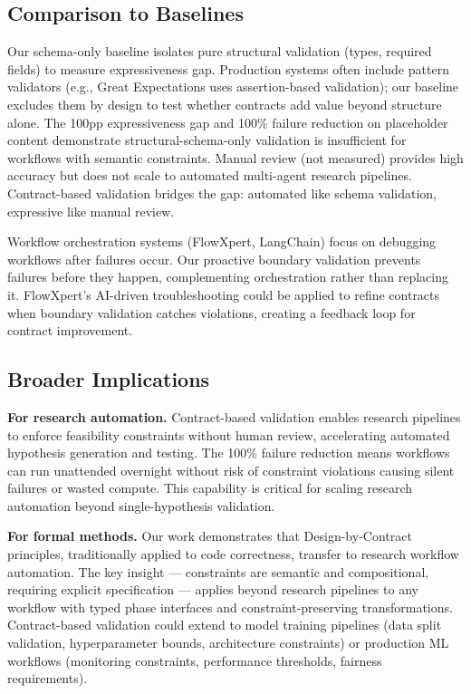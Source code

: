 \subsection{Comparison to Baselines}

Our schema-only baseline isolates pure structural validation (types, required fields) to measure expressiveness gap. Production systems often include pattern validators (e.g., Great Expectations uses assertion-based validation); our baseline excludes them by design to test whether contracts add value beyond structure alone. The 100pp expressiveness gap and 100\% failure reduction on placeholder content demonstrate structural-schema-only validation is insufficient for workflows with semantic constraints. Manual review (not measured) provides high accuracy but does not scale to automated multi-agent research pipelines. Contract-based validation bridges the gap: automated like schema validation, expressive like manual review.

Workflow orchestration systems (FlowXpert, LangChain) focus on debugging workflows after failures occur. Our proactive boundary validation prevents failures before they happen, complementing orchestration rather than replacing it. FlowXpert's AI-driven troubleshooting could be applied to refine contracts when boundary validation catches violations, creating a feedback loop for contract improvement.

\subsection{Broader Implications}

\textbf{For research automation.} Contract-based validation enables research pipelines to enforce feasibility constraints without human review, accelerating automated hypothesis generation and testing. The 100\% failure reduction means workflows can run unattended overnight without risk of constraint violations causing silent failures or wasted compute. This capability is critical for scaling research automation beyond single-hypothesis validation.

\textbf{For formal methods.} Our work demonstrates that Design-by-Contract principles, traditionally applied to code correctness, transfer to research workflow automation. The key insight --- constraints are semantic and compositional, requiring explicit specification --- applies beyond research pipelines to any workflow with typed phase interfaces and constraint-preserving transformations. Contract-based validation could extend to model training pipelines (data split validation, hyperparameter bounds, architecture constraints) or production ML workflows (monitoring constraints, performance thresholds, fairness requirements).

